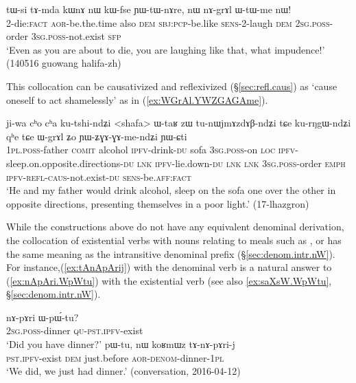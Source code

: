 \begin{exe}
\ex \label{ex:nAGrAl.WtWme}
\gll tɯ-si tɤ-mda kɯnɤ nɯ kɯ-fse ɲɯ-tɯ-nɤre, nɯ nɤ-grɤl ɯ-tɯ-me nɯ! \\
2-die:\textsc{fact} \textsc{aor}-be.the.time also \textsc{dem} \textsc{sbj}:\textsc{pcp}-be.like \textsc{sens}-2-laugh \textsc{dem} \textsc{2sg}.\textsc{poss}-order \textsc{3sg}.\textsc{poss}-not.exist \textsc{sfp} \\
\glt `Even as you are about to die, you are laughing like that, what impudence!' (140516 guowang halifa-zh)
\end{exe}

This collocation can be causativized and reflexivized (§\ref{sec:refl.caus}) as  `cause oneself to act shamelessly' as in (\ref{ex:WGrAl.YWZGAGAme}).

\begin{exe}
\ex \label{ex:WGrAl.YWZGAGAme}
\gll ji-wa cʰo cʰa ku-tshi-ndʑi <shafa> ɯ-taʁ zɯ tu-nɯjmɤzdɤβ-ndʑi tɕe ku-rŋgɯ-ndʑi qʰe tɕe
ɯ-grɤl ʑo ɲɯ-ʑɣɤ-ɣɤ-me-ndʑi ɲɯ-ɕti \\
\textsc{1pl}.\textsc{poss}-father \textsc{comit} alcohol \textsc{ipfv}-drink-\textsc{du} sofa \textsc{3sg}.\textsc{poss}-on \textsc{loc} \textsc{ipfv}-sleep.on.opposite.directions-\textsc{du} \textsc{lnk} \textsc{ipfv}-lie.down-\textsc{du} \textsc{lnk} \textsc{lnk} \textsc{3sg}.\textsc{poss}-order \textsc{emph} \textsc{ipfv}-\textsc{refl}-\textsc{caus}-not.exist-\textsc{du} \textsc{sens}-be.\textsc{aff}:\textsc{fact}   \\
\glt `He and my father would drink alcohol, sleep on the sofa one over the other in opposite directions, presenting themselves in a poor light.' (17-lhazgron)
\end{exe}


While the constructions above do not have any equivalent denominal derivation, the collocation of existential verbs with nouns relating to meals such as ,  or  has the same meaning as the intransitive  denominal prefix (§\ref{sec:denom.intr.nW}). For instance,(\ref{ex:tAnApArij}) with the denominal verb  is a natural answer to (\ref{ex:nApAri.WpWtu}) with the existential verb (see also \ref{ex:saXsW.WpWtu}, §\ref{sec:denom.intr.nW}).

\begin{exe}
\ex \label{ex:nApAri.WpWtu}
\gll nɤ-pɤri ɯ-pɯ́-tu? \\
\textsc{2sg}.\textsc{poss}-dinner \textsc{qu}-\textsc{pst}.\textsc{ipfv}-exist \\
\glt `Did you have dinner?'
\ex \label{ex:tAnApArij}
\gll pɯ-tu, nɯ koʁmɯz tɤ-nɤ-pɤri-j \\
\textsc{pst}.\textsc{ipfv}-exist \textsc{dem} just.before \textsc{aor}-\textsc{denom}-dinner-\textsc{1pl} \\
\glt `We did, we just had dinner.' (conversation, 2016-04-12)
\end{exe}
  
